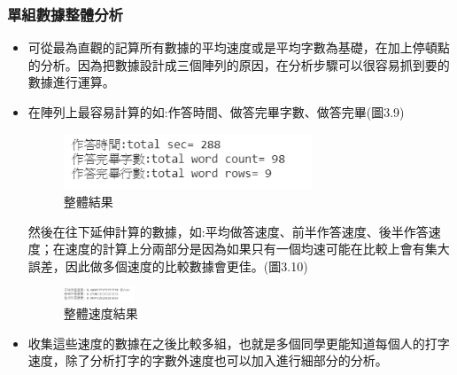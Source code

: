 \subsubsection{單組數據整體分析}
\begin{itemize}
	\item 可從最為直觀的記算所有數據的平均速度或是平均字數為基礎，在加上停頓點的分析。因為把數據設計成三個陣列的原因，在分析步驟可以很容易抓到要的數據進行運算。
	\item 在陣列上最容易計算的如:作答時間、做答完畢字數、做答完畢(圖3.9)
	\begin{figure}[H] 
		\centering 
		\includegraphics[width=0.7\textwidth]{3_8.png} 
		\caption{整體結果} 
		\label{Fig.3.9} 
	\end{figure}
	然後在往下延伸計算的數據，如:平均做答速度、前半作答速度、後半作答速度；在速度的計算上分兩部分是因為如果只有一個均速可能在比較上會有集大誤差，因此做多個速度的比較數據會更佳。(圖3.10)
	\begin{figure}[H] 
		\centering 
		\includegraphics[width=0.2\textwidth]{3_9.png} 
		\caption{整體速度結果} 
		\label{Fig.3.10} 
	\end{figure}
	\item 收集這些速度的數據在之後比較多組，也就是多個同學更能知道每個人的打字速度，除了分析打字的字數外速度也可以加入進行細部分的分析。
\end{itemize}
